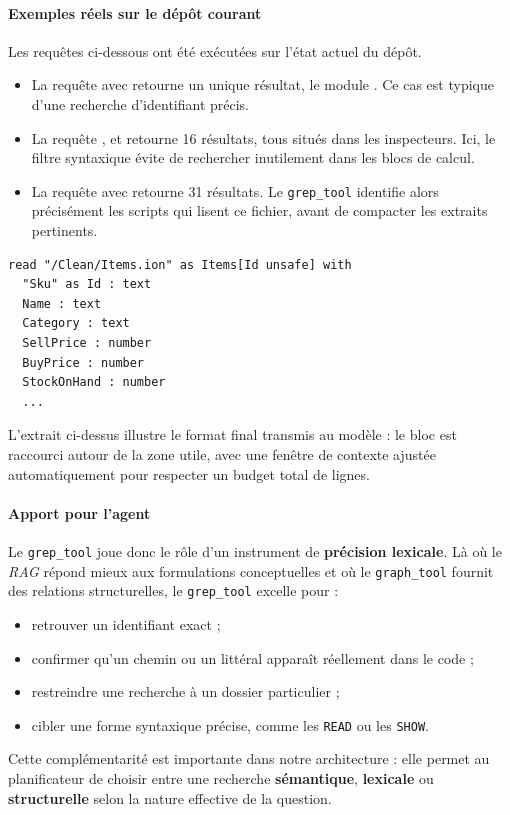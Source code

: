 \paragraph{Exemples réels sur le dépôt courant}
Les requêtes ci-dessous ont été exécutées sur l'état actuel du dépôt.
\begin{itemize}
    \item La requête  avec  retourne un unique résultat, le module . Ce cas est typique d'une recherche d'identifiant précis.
    \item La requête ,  et  retourne 16 résultats, tous situés dans les inspecteurs. Ici, le filtre syntaxique évite de rechercher inutilement dans les blocs de calcul.
    \item La requête  avec  retourne 31 résultats. Le \texttt{grep\_tool} identifie alors précisément les scripts qui lisent ce fichier, avant de compacter les extraits pertinents.
\end{itemize}

\begin{verbatim}
read "/Clean/Items.ion" as Items[Id unsafe] with
  "Sku" as Id : text
  Name : text
  Category : text
  SellPrice : number
  BuyPrice : number
  StockOnHand : number
  ...
\end{verbatim}

L'extrait ci-dessus illustre le format final transmis au modèle : le bloc est raccourci autour de la zone utile, avec une fenêtre de contexte ajustée automatiquement pour respecter un budget total de lignes.

\paragraph{Apport pour l'agent}
Le \texttt{grep\_tool} joue donc le rôle d'un instrument de \textbf{précision lexicale}. Là où le \textit{RAG} répond mieux aux formulations conceptuelles et où le \texttt{graph\_tool} fournit des relations structurelles, le \texttt{grep\_tool} excelle pour :
\begin{itemize}
    \item retrouver un identifiant exact ;
    \item confirmer qu'un chemin ou un littéral apparaît réellement dans le code ;
    \item restreindre une recherche à un dossier particulier ;
    \item cibler une forme syntaxique précise, comme les \texttt{READ} ou les \texttt{SHOW}. \\
\end{itemize}

Cette complémentarité est importante dans notre architecture : elle permet au planificateur de choisir entre une recherche \textbf{sémantique}, \textbf{lexicale} ou \textbf{structurelle} selon la nature effective de la question.
